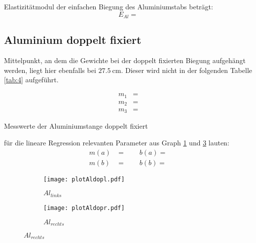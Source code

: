 \justifying Elastizitätmodul der einfachen Biegung des Aluminiumstabs beträgt:
\begin{equation}
E_{Al} =  \label{eq:}
\end{equation}


\subsection{Aluminium doppelt fixiert}

\justifying Mittelpunkt, an dem die Gewichte bei der doppelt fixierten Biegung aufgehängt werden, liegt hier ebenfalls bei 
$\SI{27.5}{\centi\meter}$. Dieser wird nicht in der folgenden Tabelle \ref{tab:4} aufgeführt.

\begin{subequations}\label{eq:}
\begin{align}
    m_1 &= \text{} \label{eq:a}\\
    m_2 &= \text{} \label{eq:b}\\
    m_3 &= \text{} \label{eq:c}
\end{align}
\end{subequations}

\begin{table}[H]
    \centering
    
    \caption{Messwerte der Aluminiumstange doppelt fixiert}
    \label{tab:4}
\end{table}

\justifying für die lineare Regression relevanten Parameter aus Graph \ref{fig:4a} und \ref{fig:4b} lauten:
\begin{subequations}\label{eq:}
\begin{align}
    m(a) &= \text{} \qquad
    b(a) = \text{}\label{eq:a}\\
    m(b) &= \text{} \qquad
    b(b) = \text{}\label{eq:b}
\end{align}
\end{subequations}

\begin{figure}[H]
\caption{Graph für Doppelbiegung, $Al_{links}$ und $Al_{rechts}$}
\label{fig:4}
\begin{subfigure}{0.495\linewidth}
    \centering
    \texttt{[image: plotAldopl.pdf]}
    \caption{$Al_{links}$}
    \label{fig:4a}
\end{subfigure}
\begin{subfigure}{0.495\linewidth}
    \centering
    \texttt{[image: plotAldopr.pdf]}
    \caption{$Al_{rechts}$}
    \label{fig:4b}
\end{subfigure}
\end{figure}

